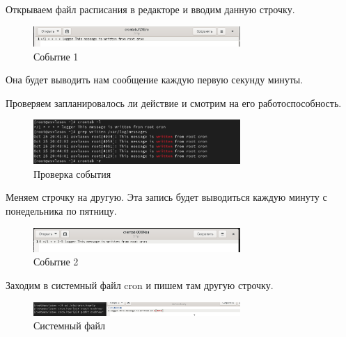 \documentclass[
  12pt,
  a4paper,
  DIV=11,
  numbers=noendperiod]{scrreprt}
\begin{document}
Открываем файл расписания в редакторе и вводим данную строчку.

\begin{figure}

{\centering \includegraphics[width=0.7\textwidth,height=\textheight]{image/2.png}

}

\caption{Событие 1}

\end{figure}%

Она будет выводить нам сообщение каждую первую секунду минуты.

Проверяем запланировалось ли действие и смотрим на его
работоспособность.

\begin{figure}

{\centering \includegraphics[width=0.7\textwidth,height=\textheight]{image/3.png}

}

\caption{Проверка события}

\end{figure}%

Меняем строчку на другую. Эта запись будет выводиться каждую минуту с
понедельника по пятницу.

\begin{figure}

{\centering \includegraphics[width=0.7\textwidth,height=\textheight]{image/4.png}

}

\caption{Событие 2}

\end{figure}%

Заходим в системный файл cron и пишем там другую строчку.

\begin{figure}

{\centering \includegraphics[width=0.7\textwidth,height=\textheight]{image/5.png}

}

\caption{Системный файл}

\end{figure}%
\end{document}
